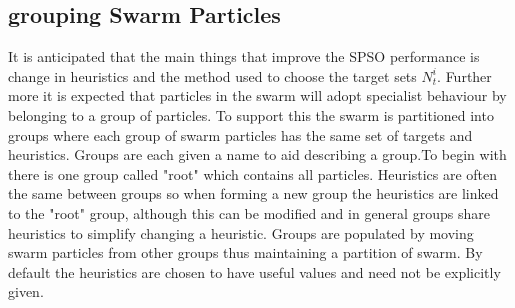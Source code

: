 \documentclass[a4paper,oneside,english]{article}
\numberwithin{equation}{section}
\numberwithin{figure}{section}
\begin{document}
\subsection{grouping Swarm Particles } 
It is anticipated  that the main things that improve the SPSO performance is change in heuristics and the method used to choose the target sets $N_t^i$. Further more it is expected that particles in the swarm will adopt specialist behaviour by belonging to a group of particles. To support this the swarm is  partitioned into groups where each group of swarm particles has the same set of targets and heuristics. Groups are each given a name to aid describing a group.To begin with there is one group called "root" which contains all particles. Heuristics are often the same between groups so when forming a new group the heuristics are linked to the "root" group, although this can be modified and in general groups share heuristics to simplify changing a heuristic. Groups are populated by moving swarm particles from other groups thus maintaining a partition of swarm. By default the heuristics are chosen to have useful values and need not be explicitly given.              
  	
	
	
	
\end{document}
